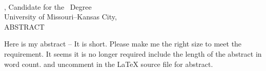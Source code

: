\begin{center}
\vspace*{0.01in}
\MakeUppercase{\MyThesisTitle}\\


\vspace{24pt}
\MyName, Candidate for the \MyDegree\ Degree\\
University of Missouri--Kansas City, \MyDegreeAwardYear\\
\vspace{24pt}
ABSTRACT
\vspace{24pt}
\end{center}
\doublespacing


Here is my abstract -- It is short. Please make me the right size to meet the requirement. It seems it is no longer
required include the length of the abstract in word count. and uncomment in the LaTeX source file for abstract. 

